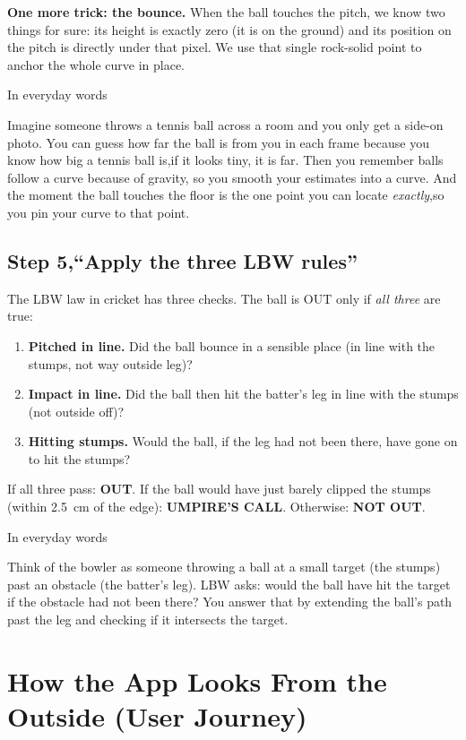 \documentclass[11pt,a4paper]{article}
\newcommand{\analogy}[1]{%
  \par\vspace{6pt}%
  \noindent
  \colorbox{WarmTint}{%
    \begin{minipage}{\dimexpr\textwidth-2\fboxsep\relax}%
      \color{white}\bfseries\strut In everyday words%
    \end{minipage}%
  }\par\nobreak
  \noindent
  \colorbox{MutedBg}{%
    \begin{minipage}{\dimexpr\textwidth-2\fboxsep\relax}%
      \color{black}\setlength{\parskip}{4pt}\strut #1\strut%
    \end{minipage}%
  }%
  \par\vspace{6pt}%
}
\begin{document}
\textbf{One more trick: the bounce.} When the ball touches the pitch, we know two things for sure: its height is exactly zero (it is on the ground) and its position on the pitch is directly under that pixel. We use that single rock-solid point to anchor the whole curve in place.

\analogy{Imagine someone throws a tennis ball across a room and you only get a side-on photo. You can guess how far the ball is from you in each frame because you know how big a tennis ball is,if it looks tiny, it is far. Then you remember balls follow a curve because of gravity, so you smooth your estimates into a curve. And the moment the ball touches the floor is the one point you can locate \emph{exactly},so you pin your curve to that point.}

\subsection{Step 5,``Apply the three LBW rules''}

The LBW law in cricket has three checks. The ball is OUT only if \emph{all three} are true:

\begin{enumerate}
    \item \textbf{Pitched in line.} Did the ball bounce in a sensible place (in line with the stumps, not way outside leg)?
    \item \textbf{Impact in line.} Did the ball then hit the batter's leg in line with the stumps (not outside off)?
    \item \textbf{Hitting stumps.} Would the ball, if the leg had not been there, have gone on to hit the stumps?
\end{enumerate}

If all three pass: \textbf{OUT}. If the ball would have just barely clipped the stumps (within 2.5~cm of the edge): \textbf{UMPIRE'S CALL}. Otherwise: \textbf{NOT OUT}.

\analogy{Think of the bowler as someone throwing a ball at a small target (the stumps) past an obstacle (the batter's leg). LBW asks: would the ball have hit the target if the obstacle had not been there? You answer that by extending the ball's path past the leg and checking if it intersects the target.}

\section{How the App Looks From the Outside (User Journey)}
\end{document}
